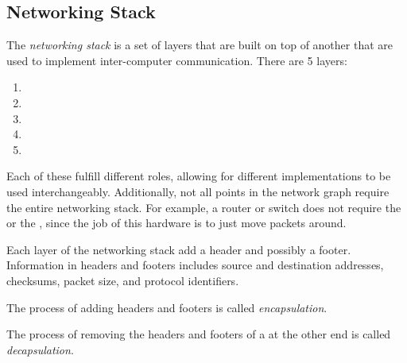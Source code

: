 \subsection{Networking Stack}\label{subsec:Networking_Stack}
\begin{definition}\label{def:Networking_Stack}
  The \emph{networking stack} is a set of layers that are built on top of another that are used to implement inter-computer communication.
  There are 5 layers:
  \begin{enumerate}[noitemsep]
  \item {}
  \item {}
  \item {}
  \item {}
  \item {}
  \end{enumerate}

  Each of these fulfill different roles, allowing for different implementations to be used interchangeably.
  Additionally, not all points in the network graph require the entire networking stack.
  For example, a router or switch does not require the  or the , since the job of this hardware is to just move packets around.
\end{definition}

Each layer of the networking stack add a header and possibly a footer.
Information in headers and footers includes source and destination addresses, checksums, packet size, and protocol identifiers.

\begin{definition}[Encapsulation]\label{def:Encapsulation}
  The process of adding headers and footers is called \emph{encapsulation}.
\end{definition}

\begin{definition}[Decapsulation]\label{def:Decapsulation}
  The process of removing the headers and footers of a  at the other end is called \emph{decapsulation}.
\end{definition}

